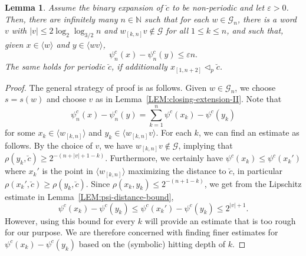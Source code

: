 \documentclass[11pt,reqno]{amsart}
\theoremstyle{plain}
\newtheorem{lemma}[theorem]{Lemma}
\theoremstyle{definition}
\newcommand{\N}{{\mathbb N}}
\newcommand{\mc}{\mathcal}
\begin{document}
\begin{lemma}
\label{LEM:block-for-variation-bound}
Assume the binary expansion of $\breve{c}$ to be non-periodic and let $\varepsilon > 0$. Then, there are infinitely many $n\in \N$ such that for each $w \in \mc G_n$, there is a word $v$ with $|v| \leqslant 2 \log_2 \log_{3/2} n$ and $w_{[k,n]}v \notin \mc G$ for all $1\leq k \leq n$, and such that, given $x \in \langle w \rangle$ and $y \in \langle wv \rangle$,
\[
\psi^c_n(x) - \psi^c_n(y) \leqslant \varepsilon n.
\]
The same holds for periodic $\breve{c}$, if additionally $x_{[1,n+2]} \triangleleft_p \breve{c}$.
\end{lemma}

\begin{proof}
The general strategy of proof is as follows. Given $w \in \mc G_n$, we choose $s = s(w)$ and choose $v$ as in Lemma~\ref{LEM:closing-extension-II}.
Note that
\begin{equation}
\label{EQ:psi-variation-decompose}
\psi^c_n(x) - \psi^c_n(y) = \sum_{k=1}^n \psi^c(x_k) - \psi^c(y_k)
\end{equation}
for some $x_k \in \langle w_{[k,n]} \rangle$ and $y_k \in \langle w_{[k,n]} v \rangle$. For each $k$, we can find an estimate as follows. By the choice of $v$, we have $w_{[k,n]}v \notin \mc G$, implying that $\rho(y_k,\breve{c}) \geqslant 2^{-(n + |v| + 1 - k)}$. Furthermore, we certainly have $\psi^c(x_k) \leqslant \psi^c(x_k')$ where $x_k'$ is the point in $\langle w_{[k,n]} \rangle$ maximizing the distance to $\breve{c}$, in particular $\rho(x_k', \breve{c}) \geqslant \rho(y_k,\breve{c})$. Since $\rho(x_k,y_k) \leqslant 2^{-(n+1-k)}$, we get from the Lipschitz estimate in Lemma~\ref{LEM:psi-distance-bound},
\begin{equation}
\label{EQ:psi-variation-general}
\psi^c(x_k) - \psi^c(y_k)
\leqslant \psi^c(x_k') - \psi^c(y_k)
\leqslant 2^{|v|+1}.
\end{equation} 
However, using this bound for every $k$ will provide an estimate that is too rough for our purpose.
We are therefore concerned with finding finer estimates for $\psi^c(x_k) - \psi^c(y_k)$ based on the (symbolic) hitting depth of $k$.



\end{proof}
\end{document}
